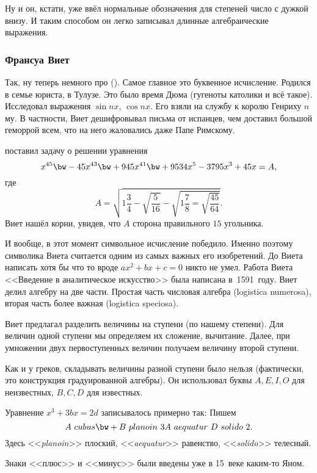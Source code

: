 \documentclass[a4paper,oneside,fleqn,10pt]{article}
\begin{document}
Ну и он, кстати, уже ввёл нормальные обозначения для степеней число с дужкой внизу.
И таким способом он легко записывал длинные алгебраические выражения.

\subsubsection{Франсуа Виет}

Так, ну теперь немного про  (). Самое главное это буквенное исчисление.
Родился в семье юриста, в Тулузе. Это было время Дюма (гугеноты католики и всё такое).
Исследовал выражения $\sin nx$, $\cos nx$. Его взяли на службу к королю Генриху $n$ му.
В частности, Виет дешифровывал письма от испанцев, чем доставил большой геморрой всем,
что на него жаловались даже Папе Римскому.

 поставил задачу о решении уравнения
$$x^{45} \bw- 45x^{43} \bw+ 945x^{41} \bw+ 9534x^5 -3795x^3 + 45x = A,$$
где
$$A = \sqrt{1\frac34-\sqrt{\frac{5}{16}} - \sqrt{1\frac78 = \sqrt{\frac{45}{64}}}}.$$
Виет нашёл корни, увидев, что $A$ сторона правильного $15$ угольника.

И вообще, в этот момент символьное исчисление победило.
Именно поэтому символика Виета считается одним из самых важных его изобретений.
До Виета написать хотя бы что то вроде $ax^2 + bx + c = 0$ никто не умел. Работа Виета
<<Введение в аналитическое искусство>> была написана в~1591~году. Виет делил алгебру
на две части. Простая часть числовая алгебра (logistica numerosa), вторая часть
более важная (logistica speciosa).

Виет предлагал разделить величины на ступени (по нашему степени).
Для величин одной ступени мы определяем их сложение, вычитание.
Далее, при умножении двух первоступенных величин получаем величину второй ступени.

Как и у греков, складывать величины разной ступени было нельзя (фактически, это конструкция
градуированной алгебры). Он использовал буквы $A, E, I, O$ для неизвестных, $B, C, D$ для известных.

\begin{ex}
Уравнение $x^3 + 3bx = 2d$ записывалось примерно так:
Пишем $$A~cubus\bw+B~planoin~3A~aequatur~D~solido~2.$$
Здесь <<\emph{planoin}>> плоский, <<\emph{aequatur}>> равенство, <<\emph{solido}>> телесный.
\end{ex}

\begin{note}
Знаки <<плюс>> и <<минус>> были введены уже в 15~веке каким-то Яном.
\end{note}
\end{document}
